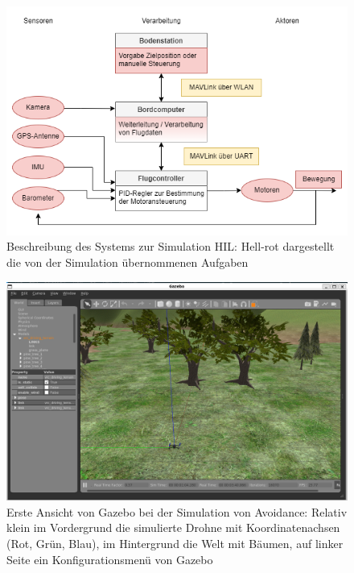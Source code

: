 \begin{figure}[!ht]
    \centering
    \includegraphics[width=\linewidth]{images/001_vereinfacht-Page-3_simuliert.drawio.png}
    \caption[Beschreibung des Systems zur Simulation HIL]{Beschreibung des Systems zur Simulation HIL: Hell-rot dargestellt die von der Simulation übernommenen Aufgaben}
    \label{fig:system_sim}
\end{figure}

\begin{figure}[!ht]
    \centering
    \includegraphics[width=\linewidth]{images/sim_gazebo.png}
    \caption[Ansicht Gazebo Simulator]{Erste Ansicht von Gazebo bei der Simulation von Avoidance: Relativ klein im Vordergrund die simulierte Drohne mit Koordinatenachsen (Rot, Grün, Blau), im Hintergrund die Welt mit Bäumen, auf linker Seite ein Konfigurationsmenü von Gazebo}
    \label{fig:sim_gazebo}
\end{figure}

